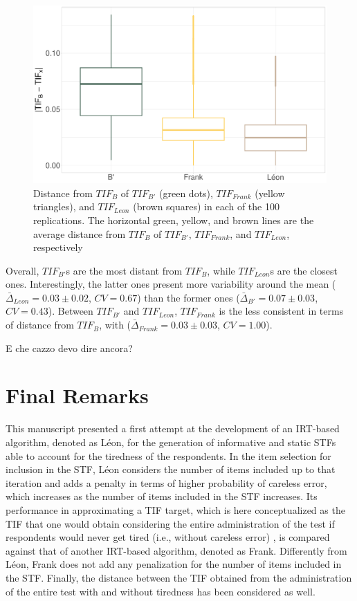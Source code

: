 \documentclass{svproc}
\begin{document}
\begin{figure}[!h]
	\centering
	\includegraphics[width=\linewidth]{img/box-plot-alogirthms}
	\caption{Distance from $TIF_{B}$ of $TIF_{B'}$ (green dots), $TIF_{Frank}$ (yellow triangles), and $TIF_{Leon}$ (brown squares) in each of the 100 replications. The horizontal green, yellow, and brown lines are the average distance from $TIF_B$ of $TIF_{B'}$, $TIF_{Frank}$, and $TIF_{Leon}$, respectively}
	\label{fig:points-alogirthms}
\end{figure}

Overall, $TIF_{B'}$s are the most distant from $TIF_B$, while $TIF_{Leon}$s are the closest ones. Interestingly, the latter ones present more variability around the mean ($\bar{\Delta}_{Leon} = 0.03	\pm	0.02$, $CV =0.67$) than the former ones ($\bar{\Delta}_{B'} = 0.07	\pm	0.03$, $CV =0.43$). Between $TIF_{B'}$ and $TIF_{Leon}$, $TIF_{Frank}$ is the less consistent in terms of distance from $TIF_{B}$, with ($\bar{\Delta}_{Frank} = 0.03	\pm	0.03$, $CV = 1.00$). 

E che cazzo devo dire ancora? 

\section{Final Remarks}

This manuscript presented a first attempt at the development of an IRT-based algorithm, denoted as Léon, for the generation of informative and static STFs able to account for the tiredness of the respondents. In the item selection for inclusion in the STF, Léon considers the number of items included up to that iteration and adds a penalty in terms of higher probability of careless error, which increases as the number of items included in the STF increases. Its performance in approximating a TIF target, which is here conceptualized as the TIF that one would obtain considering the entire administration of the test if respondents would never get tired (i.e., without careless error) , is compared against that of another IRT-based algorithm, denoted as Frank. Differently from Léon, Frank does not add any penalization for the number of items included in the STF. Finally, the distance between the TIF obtained from the administration of the entire test with and without tiredness has been considered as well. 
\end{document}
